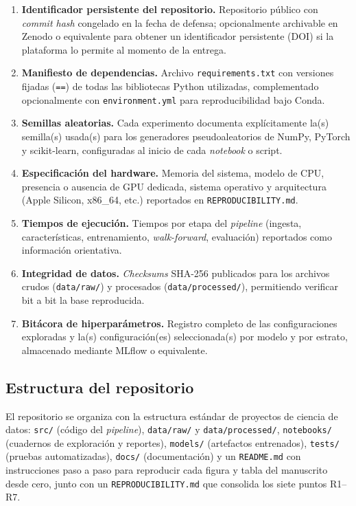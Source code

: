 \documentclass[12pt,letterpaper]{report}
\begin{document}
\begin{enumerate}[label=R\arabic*., leftmargin=1.3cm, itemsep=2pt, topsep=4pt]
    \item \textbf{Identificador persistente del repositorio.} Repositorio público con \textit{commit hash} congelado en la fecha de defensa; opcionalmente archivable en Zenodo o equivalente para obtener un identificador persistente (DOI) si la plataforma lo permite al momento de la entrega.
    \item \textbf{Manifiesto de dependencias.} Archivo \texttt{requirements.txt} con versiones fijadas (\texttt{==}) de todas las bibliotecas Python utilizadas, complementado opcionalmente con \texttt{environment.yml} para reproducibilidad bajo Conda.
    \item \textbf{Semillas aleatorias.} Cada experimento documenta explícitamente la(s) semilla(s) usada(s) para los generadores pseudoaleatorios de NumPy, PyTorch y scikit-learn, configuradas al inicio de cada \textit{notebook} o script.
    \item \textbf{Especificación del hardware.} Memoria del sistema, modelo de CPU, presencia o ausencia de GPU dedicada, sistema operativo y arquitectura (Apple Silicon, x86\_64, etc.) reportados en \texttt{REPRODUCIBILITY.md}.
    \item \textbf{Tiempos de ejecución.} Tiempos por etapa del \textit{pipeline} (ingesta, características, entrenamiento, \textit{walk-forward}, evaluación) reportados como información orientativa.
    \item \textbf{Integridad de datos.} \textit{Checksums} SHA-256 publicados para los archivos crudos (\texttt{data/raw/}) y procesados (\texttt{data/processed/}), permitiendo verificar bit a bit la base reproducida.
    \item \textbf{Bitácora de hiperparámetros.} Registro completo de las configuraciones exploradas y la(s) configuración(es) seleccionada(s) por modelo y por estrato, almacenado mediante MLflow o equivalente.
\end{enumerate}

\subsection*{Estructura del repositorio}

El repositorio se organiza con la estructura estándar de proyectos de ciencia de datos: \texttt{src/} (código del \textit{pipeline}), \texttt{data/raw/} y \texttt{data/processed/}, \texttt{notebooks/} (cuadernos de exploración y reportes), \texttt{models/} (artefactos entrenados), \texttt{tests/} (pruebas automatizadas), \texttt{docs/} (documentación) y un \texttt{README.md} con instrucciones paso a paso para reproducir cada figura y tabla del manuscrito desde cero, junto con un \texttt{REPRODUCIBILITY.md} que consolida los siete puntos R1--R7.
\end{document}

